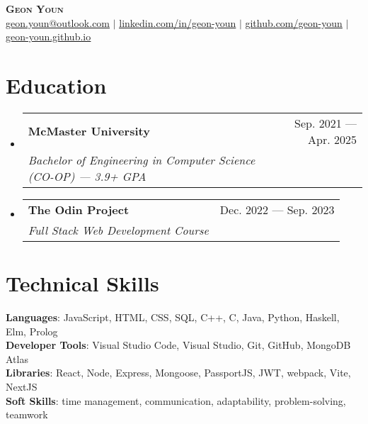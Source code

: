 \documentclass[letterpaper,11pt]{article}
\makeatletter
\newcommand{\resumeItem}[1]{
	\item\small{
		{#1 \vspace{-2pt}}
	}
}
\newcommand{\resumeSubheading}[4]{
	\vspace{-2pt}\item
	\begin{tabular*}{0.97\textwidth}[t]{l@{\extracolsep{\fill}}r}
		\textbf{#1} & #2 \\
		\textit{\small#3} & \textit{\small #4} \\
	\end{tabular*}\vspace{-7pt}
}
\newcommand{\resumeSubHeadingListStart}{\begin{itemize}[leftmargin=0.15in,
			label={}]}
\newcommand{\resumeSubHeadingListEnd}{\end{itemize}}
\newcommand{\resumeItemListStart}{\begin{itemize}}
\newcommand{\resumeItemListEnd}{\end{itemize}\vspace{-5pt}}
\makeatother
\begin{document}
\begin{center}
	\textbf{\Huge \scshape Geon Youn} \\ \vspace{1pt}
	\small
	\href{mailto:geon.youn@outlook.com}{\underline{geon.youn@outlook.com}}
	$|$
	\href{https://linkedin.com/in/geon-youn}{\underline{linkedin.com/in/geon-youn}}
	$|$
	\href{https://github.com/geon-youn}{\underline{github.com/geon-youn}}
  $|$
  \href{https://geon-youn.github.io/}{\underline{geon-youn.github.io}}
\end{center}

\section{Education}
\resumeSubHeadingListStart
\resumeSubheading
{McMaster University}{Sep. 2021 --- Apr. 2025}
{Bachelor of Engineering in Computer Science (CO-OP) --- 3.9+ GPA}{}
\resumeSubheading
{The Odin Project}{Dec. 2022 --- Sep. 2023}
{Full Stack Web Development Course}{}
\resumeSubHeadingListEnd

\section{Technical Skills}
\begin{itemize}[leftmargin=0.15in, label={}]
	\small{\item{
		            \textbf{Languages}{: JavaScript, HTML, CSS, SQL, C++, C, Java, Python, Haskell,
			            Elm, Prolog} \\
		            \textbf{Developer Tools}{: Visual Studio Code, Visual Studio, Git, GitHub, MongoDB Atlas} \\
		            \textbf{Libraries}{: React, Node, Express, Mongoose, PassportJS, JWT, webpack, Vite, NextJS} \\
		            \textbf{Soft Skills}{: time management,
			            communication, adaptability,
			            problem-solving, teamwork}
		      }}
\end{itemize}

%
\end{document}
